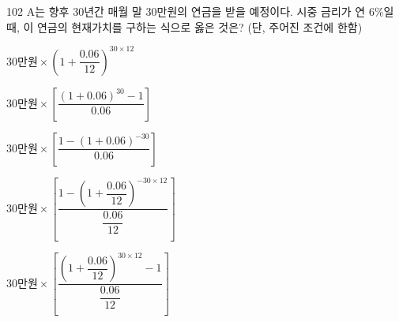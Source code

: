 \begin{question}{102}
A는 향후 30년간 매월 말 30만원의 연금을 받을 예정이다. 시중 금리가 연 6\%일 때, 이 연금의 현재가치를 구하는 식으로 옳은 것은? (단, 주어진 조건에 한함)
\begin{choices}
  \item $30\text{만원} \times \left(1 + \dfrac{0.06}{12}\right)^{30 \times 12}$
  \item $30\text{만원} \times \left[\dfrac{(1+0.06)^{30} - 1}{0.06}\right]$
  \item $30\text{만원} \times \left[\dfrac{1 - (1+0.06)^{-30}}{0.06}\right]$
  \item $30\text{만원} \times \left[\dfrac{1 - \left(1 + \dfrac{0.06}{12}\right)^{-30 \times 12}}{\dfrac{0.06}{12}}\right]$
  \item $30\text{만원} \times \left[\dfrac{\left(1 + \dfrac{0.06}{12}\right)^{30 \times 12} - 1}{\dfrac{0.06}{12}}\right]$
\end{choices}
\end{question}

